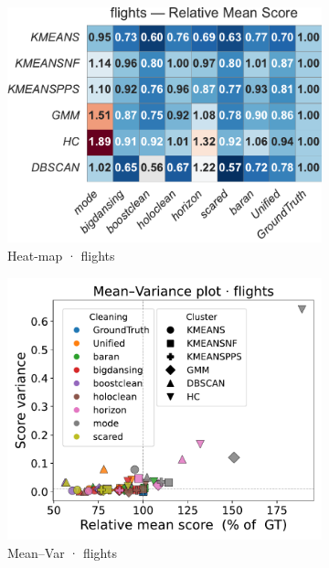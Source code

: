 \documentclass[10pt]{article} %
\numberwithin{equation}{section}
\begin{document}
\begin{figure}[htbp]
  \vspace{0.6em}
  \begin{subfigure}{0.32\linewidth}
    \centering
    \includegraphics[width=\linewidth]{figures/5.3.1graph/heatmap_rel_flights.pdf}
    \caption{Heat-map · flights}
  \end{subfigure}\hfill
  \begin{subfigure}{0.32\linewidth}
    \centering
    \includegraphics[width=\linewidth]{figures/5.3.1graph/mean_var_scatter_flights.pdf}
    \caption{Mean–Var · flights}
  \end{subfigure}\hfill
  \begin{subfigure}{0.32\linewidth}

\end{subfigure}
\end{figure}
\end{document}
